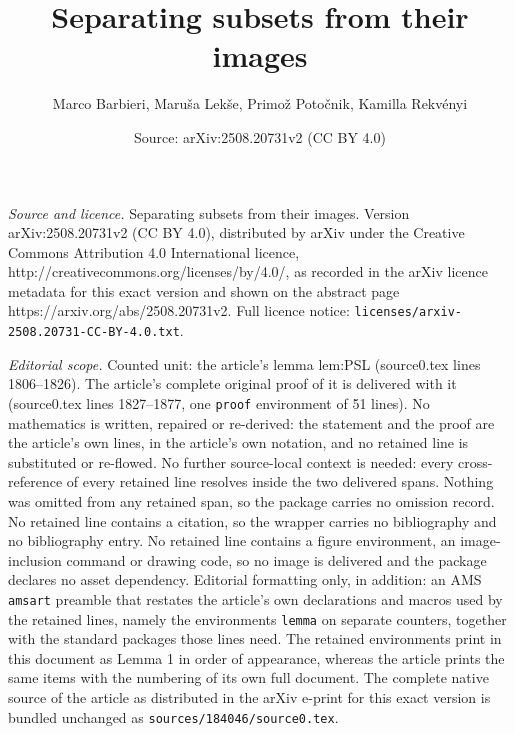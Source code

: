 \documentclass[10pt,a4paper]{amsart}
\title{Separating subsets from their images}
\author{Marco Barbieri, Maru\v{s}a Lek\v{s}e, Primo\v{z} Poto\v{c}nik, Kamilla Rekv\'enyi}
\date{Source: arXiv:2508.20731v2 (CC BY 4.0)}
\begin{document}
\maketitle

\noindent\emph{Source and licence.} Separating subsets from their images. Version arXiv:2508.20731v2 (CC BY 4.0), distributed by arXiv under the Creative Commons Attribution 4.0 International licence, http://creativecommons.org/licenses/by/4.0/, as recorded in the arXiv licence metadata for this exact version and shown on the abstract page https://arxiv.org/abs/2508.20731v2. Full licence notice: \texttt{licenses/arxiv-2508.20731-CC-BY-4.0.txt}.\par\smallskip

\noindent\textit{Editorial scope.} Counted unit: the article's lemma lem:PSL (source0.tex lines 1806--1826). The article's complete original proof of it is delivered with it (source0.tex lines 1827--1877, one \texttt{proof} environment of 51 lines). No mathematics is written, repaired or re-derived: the statement and the proof are the article's own lines, in the article's own notation, and no retained line is substituted or re-flowed.  No further source-local context is needed: every cross-reference of every retained line resolves inside the two delivered spans.  Nothing was omitted from any retained span, so the package carries no omission record.  No retained line contains a citation, so the wrapper carries no bibliography and no bibliography entry.  No retained line contains a figure environment, an image-inclusion command or drawing code, so no image is delivered and the package declares no asset dependency.  Editorial formatting only, in addition: an AMS \texttt{amsart} preamble that restates the article's own declarations and macros used by the retained lines, namely the environments \texttt{lemma} on separate counters, together with the standard packages those lines need.  The retained environments print in this document as Lemma 1 in order of appearance, whereas the article prints the same items with the numbering of its own full document.  The complete native source of the article as distributed in the arXiv e-print for this exact version is bundled unchanged as \texttt{sources/184046/source0.tex}.
\end{document}
